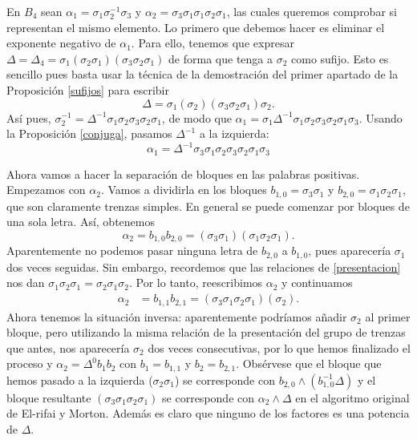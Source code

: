 \documentclass[bibtex, anon]{TEMat-article}
\begin{document}
\begin{ejemplo}
	En $B_4$ sean $\alpha_1=\sigma_1\sigma_2^{-1}\sigma_3$ y $\alpha_2=\sigma_3\sigma_1\sigma_1\sigma_2\sigma_1$, las cuales queremos comprobar si representan el mismo elemento. Lo primero que debemos hacer es eliminar el exponente negativo de $\alpha_1$. Para ello, tenemos que expresar $\Delta=\Delta_4=\sigma_1(\sigma_2\sigma_1)(\sigma_3\sigma_2\sigma_1)$ de forma que tenga a $\sigma_2$ como sufijo. Esto es sencillo pues basta usar la técnica de la demostración del primer apartado de la Proposición \ref{sufijos} para escribir
	\[
	\Delta=\sigma_1(\sigma_2)(\sigma_3\sigma_2\sigma_1)\sigma_2.
	\]
	Así pues, $\sigma_2^{-1}=\Delta^{-1}\sigma_1\sigma_2\sigma_3\sigma_2\sigma_1$, de modo que $\alpha_1=\sigma_1\Delta^{-1}\sigma_1\sigma_2\sigma_3\sigma_2\sigma_1\sigma_3$. Usando la Proposición \ref{conjuga}, pasamos $\Delta^{-1}$ a la izquierda:
	\[
	\alpha_1=\Delta^{-1}\sigma_3\sigma_1\sigma_2\sigma_3\sigma_2\sigma_1\sigma_3
	\]
	
	Ahora vamos a hacer la separación de bloques en las palabras positivas. Empezamos con $\alpha_2$. Vamos a dividirla en los bloques $b_{1,0}=\sigma_3\sigma_1$ y $b_{2,0}=\sigma_1\sigma_2\sigma_1$, que son claramente trenzas simples. En general se puede comenzar por bloques de una sola letra. Así, obtenemos
	\[
	\alpha_2=b_{1,0}b_{2,0}=(\sigma_3\sigma_1)(\sigma_1\sigma_2\sigma_1).
	\]
	Aparentemente no podemos pasar ninguna letra de $b_{2,0}$ a $b_{1,0}$, pues aparecería $\sigma_1$ dos veces seguidas. Sin embargo, recordemos que las relaciones de \ref{presentacion} nos dan $\sigma_1\sigma_2\sigma_1=\sigma_2\sigma_1\sigma_2$. Por lo tanto, reescribimos $\alpha_2$ y continuamos
	\begin{align*}
	\alpha_2&=b_{1,1}b_{2,1}=(\sigma_3\sigma_1\sigma_2\sigma_1)(\sigma_2).
	\end{align*}
	Ahora tenemos la situación inversa: aparentemente podríamos añadir $\sigma_2$ al primer bloque, pero utilizando la misma relación de la presentación del grupo de trenzas que antes, nos aparecería $\sigma_2$ dos veces consecutivas, por lo que hemos finalizado el proceso y $\alpha_2=\Delta^0b_1b_2$ con $b_1=b_{1,1}$ y $b_2=b_{2,1}$. Obsérvese que el bloque que hemos pasado a la izquierda ($\sigma_2\sigma_1$) se corresponde con $b_{2,0}\land (b_{1,0}^{-1}\Delta)$ y el bloque resultante $(\sigma_3\sigma_1\sigma_2\sigma_1)$ se corresponde con $\alpha_2\land\Delta$ en el algoritmo original de El-rifai y Morton. Además es claro que ninguno de los factores es una potencia de $\Delta$.
	\end{ejemplo}
\end{document}
